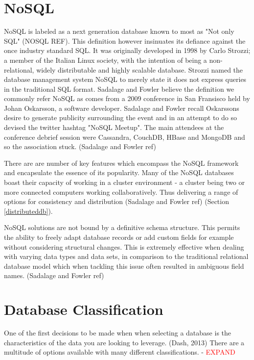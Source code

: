\section{NoSQL}\label{nosql}
NoSQL is labeled as a next generation database known to most as "Not only SQL" (NOSQL REF). This definition however insinuates its defiance against the once industry standard SQL. It was originally developed in 1998 by Carlo Strozzi; a member of the Italian Linux society, with the intention of being a non-relational, widely distributable and highly scalable database. Strozzi named the database management system NoSQL to merely state it does not express queries in the traditional SQL format. Sadalage and Fowler believe the definition we commonly refer NoSQL as comes from a 2009 conference in San Fransisco held by Johan Oskarsson, a software developer. Sadalage and Fowler recall Oskarssons desire to generate publicity surrounding the event and in an attempt to do so devised the twitter hashtag "NoSQL Meetup". The main attendees at the conference debrief session were Cassandra, CouchDB, HBase and MongoDB and so the association stuck. (Sadalage and Fowler ref)

There are are number of key features which encompass the NoSQL framework and encapsulate the essence of its popularity. Many of the NoSQL databases boast their capacity of working in a cluster environment - a cluster being two or more connected computers working collaboratively. Thus delivering a range of options for consistency and distribution (Sadalage and Fowler ref) (Section \ref{distributeddb}).

NoSQL solutions are not bound by a definitive schema structure. This permits the ability to freely adapt database records or add custom fields for example without considering structural changes. This is extremely effective when dealing with varying data types and data sets, in comparison to the traditional relational database model which when tackling this issue often resulted in ambiguous field names. (Sadalage and Fowler ref)

\section{Database Classification}\label{dbclass}
One of the first decisions to be made when when selecting a database is the characteristics of the data you are looking to leverage. (Dash, 2013) There are a multitude of options available with many different classifications. - \textcolor{red}{EXPAND}

